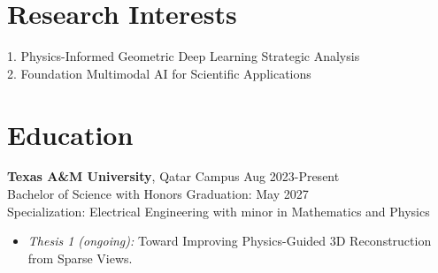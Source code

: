 \documentclass[resmargin, 10pt]{res} %
\begin{document}
\begin{resume}


\vspace{-20pt}
\section{Research Interests}

1. Physics-Informed Geometric Deep Learning Strategic Analysis \\
2. Foundation Multimodal AI for Scientific Applications


\vspace{-5pt}


\section{Education}

{\bf Texas A\&M University}, Qatar Campus \hfill Aug 2023-Present \\
Bachelor of Science with Honors \hfill Graduation: May 2027 \\
Specialization: Electrical Engineering with minor in Mathematics and Physics \\

\begin{itemize}[itemsep=0em]
\vspace{-10pt}
\item {\sl Thesis 1 (ongoing):} Toward Improving Physics-Guided 3D Reconstruction from Sparse Views.
\end{itemize}


\end{resume}
\end{document}
